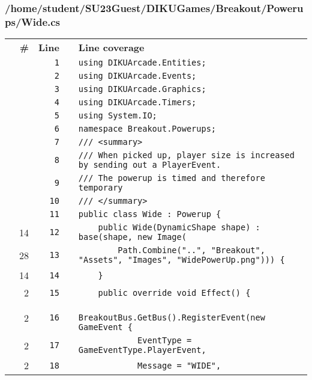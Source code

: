 \documentclass[a4paper,landscape,10pt]{article}
\begin{document}
\subsubsection{/home/student/SU23Guest/DIKUGames/Breakout/Powerups/Wide.cs}
\begin{longtable}[l]{lrrll}
\textbf{} & \textbf{\#} & \textbf{Line} & \textbf{} & \textbf{Line coverage}\\
\cellcolor{gray} &  & \verb~1~ & & \verb~using DIKUArcade.Entities;~\\
\cellcolor{gray} &  & \verb~2~ & & \verb~using DIKUArcade.Events;~\\
\cellcolor{gray} &  & \verb~3~ & & \verb~using DIKUArcade.Graphics;~\\
\cellcolor{gray} &  & \verb~4~ & & \verb~using DIKUArcade.Timers;~\\
\cellcolor{gray} &  & \verb~5~ & & \verb~using System.IO;~\\
\cellcolor{gray} &  & \verb~6~ & & \verb~namespace Breakout.Powerups;~\\
\cellcolor{gray} &  & \verb~7~ & & \verb~/// <summary>~\\
\cellcolor{gray} &  & \verb~8~ & & \verb~/// When picked up, player size is increased by sending out a PlayerEvent.~\\
\cellcolor{gray} &  & \verb~9~ & & \verb~/// The powerup is timed and therefore temporary~\\
\cellcolor{gray} &  & \verb~10~ & & \verb~/// </summary>~\\
\cellcolor{gray} &  & \verb~11~ & & \verb~public class Wide : Powerup {~\\
\cellcolor{green} & 14 & \verb~12~ & & \verb~    public Wide(DynamicShape shape) : base(shape, new Image(~\\
\cellcolor{green} & 28 & \verb~13~ & & \verb~        Path.Combine("..", "Breakout", "Assets", "Images", "WidePowerUp.png"))) {~\\
\cellcolor{green} & 14 & \verb~14~ & & \verb~    }~\\
\cellcolor{green} & 2 & \verb~15~ & & \verb~    public override void Effect() {~\\
\cellcolor{green} & 2 & \verb~16~ & & \verb~        BreakoutBus.GetBus().RegisterEvent(new GameEvent {~\\
\cellcolor{green} & 2 & \verb~17~ & & \verb~            EventType = GameEventType.PlayerEvent,~\\
\cellcolor{green} & 2 & \verb~18~ & & \verb~            Message = "WIDE",~\\

\end{longtable}
\end{document}
